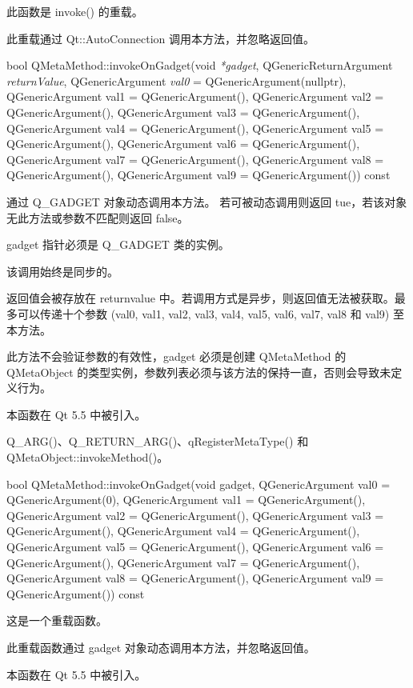 此函数是 invoke() 的重载。

此重载通过 Qt::AutoConnection 调用本方法，并忽略返回值。

bool QMetaMethod::invokeOnGadget(void \emph{*gadget}, QGenericReturnArgument \emph{returnValue}, QGenericArgument \emph{val0} = QGenericArgument(nullptr), QGenericArgument val1 = QGenericArgument(), QGenericArgument val2 = QGenericArgument(), QGenericArgument val3 = QGenericArgument(), QGenericArgument val4 = QGenericArgument(), QGenericArgument val5 = QGenericArgument(), QGenericArgument val6 = QGenericArgument(), QGenericArgument val7 = QGenericArgument(), QGenericArgument val8 = QGenericArgument(), QGenericArgument val9 = QGenericArgument()) const

通过 Q\_GADGET 对象动态调用本方法。
若可被动态调用则返回 tue，若该对象无此方法或参数不匹配则返回 false。

gadget 指针必须是 Q\_GADGET 类的实例。

该调用始终是同步的。

返回值会被存放在 returnvalue 中。若调用方式是异步，则返回值无法被获取。最多可以传递十个参数 (val0, val1, val2, val3, val4, val5, val6, val7, val8 和 val9) 至本方法。

\begin{notice}[另请参阅]
此方法不会验证参数的有效性，gadget 必须是创建 QMetaMethod 的 QMetaObject 的类型实例，参数列表必须与该方法的保持一直，否则会导致未定义行为。
\end{notice}

本函数在 Qt 5.5 中被引入。

\begin{notice}[另请参阅]
Q\_ARG()、Q\_RETURN\_ARG()、qRegisterMetaType() 和 QMetaObject::invokeMethod()。
\end{notice}

bool QMetaMethod::invokeOnGadget(void \*gadget, QGenericArgument val0 = QGenericArgument(0), QGenericArgument val1 = QGenericArgument(), QGenericArgument val2 = QGenericArgument(), QGenericArgument val3 = QGenericArgument(), QGenericArgument val4 = QGenericArgument(), QGenericArgument val5 = QGenericArgument(), QGenericArgument val6 = QGenericArgument(), QGenericArgument val7 = QGenericArgument(), QGenericArgument val8 = QGenericArgument(), QGenericArgument val9 = QGenericArgument()) const

这是一个重载函数。

此重载函数通过 gadget 对象动态调用本方法，并忽略返回值。

本函数在 Qt 5.5 中被引入。

